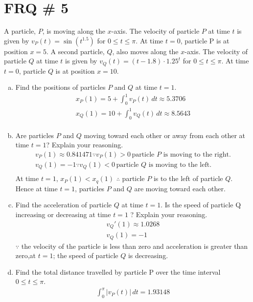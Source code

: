 \documentclass[11pt,letterpaper]{article}
\begin{document}
\section*{FRQ \# 5}
A particle, $P$, is moving along the $x$-axis. The velocity of particle $P$ at time $t$ is given by $v_{P}(t)= \sin(t^{1.5})$ for $0 \leq t\leq \pi$. At time $t = 0$, particle P is at position $x = 5$. A second particle, $Q$, also moves along the $x$-axis. The velocity of particle $Q$ at time $t$ is given by $v_Q(t)=(t-1.8)\cdot 1.25^t$ for $0 \leq t\leq \pi$. At time $t = 0$, particle $Q$ is at position $x = 10$.
\begin{enumerate}[a.)]
    \item Find the positions of particles $P$ and $Q$ at time $t = 1$.
    \begin{align*}
        x_{P}(1)=5+\int_{0}^{1} v_{P}(t) \, dt \approx 5.3706\\
        x_{Q}(1)=10+\int_{0}^{1} v_{Q}(t) \, dt \approx 8.5643\\
    \end{align*}
    \item Are particles $P$ and $Q$ moving toward each other or away from each other at time $t = 1$? Explain your reasoning.
     \begin{align*}
     v_P(1) \approx 0.841471 \because  v_P(1)>0 \, \text{particle $P$ is moving to the right.} \\
     v_Q(1) = -1 \because  v_Q(1)<0 \, \text{particle $Q$ is moving to the left.} \\
    \end{align*}
   At time $t = 1$, $x_P(1)<x_q(1)$ $\therefore$ particle $P$ is to the left of particle $Q$. Hence at time $t = 1$, particles $P$ and $Q$ are moving toward each other.
   \item Find the acceleration of particle $Q$ at time $t = 1$. Is the speed of particle Q increasing or decreasing at time $t = 1$ ? Explain your reasoning.
   \begin{align*}
       v_Q'(1) \approx 1.0268\\
       v_Q(1)=-1
   \end{align*}
$\because$ the velocity of the particle is less than zero and acceleration is greater than zero,at $t=1$; the speed of particle $Q$ is decreasing.
\item Find the total distance travelled by particle P over the time interval $0\leq t \leq\pi$.
\begin{align*}
\int_{0}^{\pi} |v_{P}(t)| \, dt = 1.93148
\end{align*}
\end{enumerate}
\end{document}
